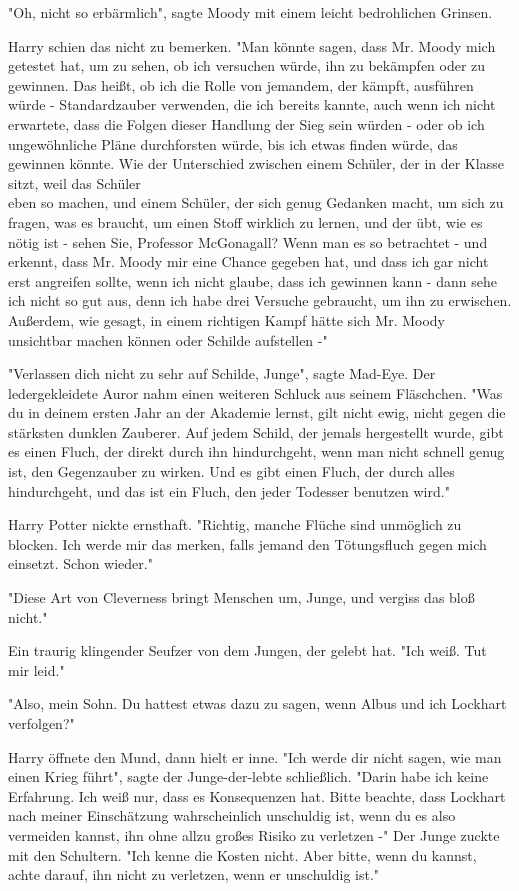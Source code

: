 {"Oh, nicht so erbärmlich", sagte Moody mit einem leicht bedrohlichen Grinsen.

Harry schien das nicht zu bemerken. "Man könnte sagen, dass Mr. Moody mich getestet hat, um zu sehen, ob ich versuchen würde, ihn zu bekämpfen oder zu gewinnen. Das heißt, ob ich die Rolle von jemandem, der kämpft, ausführen würde - Standardzauber verwenden, die ich bereits kannte, auch wenn ich nicht erwartete, dass die Folgen dieser Handlung der Sieg sein würden - oder ob ich ungewöhnliche Pläne durchforsten würde, bis ich etwas finden würde, das gewinnen könnte. Wie der Unterschied zwischen einem Schüler, der in der Klasse sitzt, weil das Schüler\\ eben so machen, und einem Schüler, der sich genug Gedanken macht, um sich zu fragen, was es braucht, um einen Stoff wirklich zu lernen, und der übt, wie es nötig ist - sehen Sie, Professor McGonagall? Wenn man es so betrachtet - und erkennt, dass Mr. Moody mir eine Chance gegeben hat, und dass ich gar nicht erst angreifen sollte, wenn ich nicht glaube, dass ich gewinnen kann - dann sehe ich nicht so gut aus, denn ich habe drei Versuche gebraucht, um ihn zu erwischen. Außerdem, wie gesagt, in einem richtigen Kampf hätte sich Mr. Moody unsichtbar machen können oder Schilde aufstellen -"

"Verlassen dich nicht zu sehr auf Schilde, Junge", sagte Mad-Eye. Der ledergekleidete Auror nahm einen weiteren Schluck aus seinem Fläschchen. "Was du in deinem ersten Jahr an der Akademie lernst, gilt nicht ewig, nicht gegen die stärksten dunklen Zauberer. Auf jedem Schild, der jemals hergestellt wurde, gibt es einen Fluch, der direkt durch ihn hindurchgeht, wenn man nicht schnell genug ist, den Gegenzauber zu wirken. Und es gibt einen Fluch, der durch alles hindurchgeht, und das ist ein Fluch, den jeder Todesser benutzen wird."

Harry Potter nickte ernsthaft. "Richtig, manche Flüche sind unmöglich zu blocken. Ich werde mir das merken, falls jemand den Tötungsfluch gegen mich einsetzt. Schon wieder."

"Diese Art von Cleverness bringt Menschen um, Junge, und vergiss das bloß nicht."

Ein traurig klingender Seufzer von dem Jungen, der gelebt hat. "Ich weiß. Tut mir leid."

"Also, mein Sohn. Du hattest etwas dazu zu sagen, wenn Albus und ich Lockhart verfolgen?"

Harry öffnete den Mund, dann hielt er inne. "Ich werde dir nicht sagen, wie man einen Krieg führt", sagte der Junge-der-lebte schließlich. "Darin habe ich keine Erfahrung. Ich weiß nur, dass es Konsequenzen hat. Bitte beachte, dass Lockhart nach meiner Einschätzung wahrscheinlich unschuldig ist, wenn du es also vermeiden kannst, ihn ohne allzu großes Risiko zu verletzen -" Der Junge zuckte mit den Schultern. "Ich kenne die Kosten nicht. Aber bitte, wenn du kannst, achte darauf, ihn nicht zu verletzen, wenn er unschuldig ist."

}
